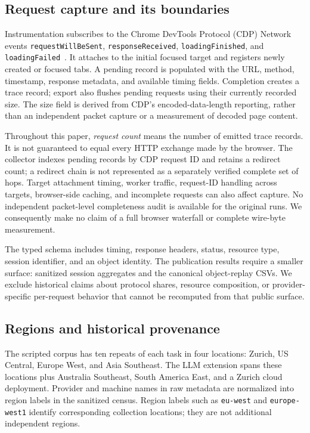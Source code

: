 \documentclass[10pt,sigconf,nonacm]{acmart}
\begin{document}
\subsection{Request capture and its boundaries}
Instrumentation subscribes to the Chrome DevTools Protocol (CDP) Network events \texttt{request\allowbreak Will\allowbreak Be\allowbreak Sent}, \texttt{response\allowbreak Received}, \texttt{loading\allowbreak Finished}, and \texttt{loading\allowbreak Failed}~\cite{cdp}. It attaches to the initial focused target and registers newly created or focused tabs. A pending record is populated with the URL, method, timestamp, response metadata, and available timing fields. Completion creates a trace record; export also flushes pending requests using their currently recorded size. The size field is derived from CDP's encoded-data-length reporting, rather than an independent packet capture or a measurement of decoded page content.

Throughout this paper, \emph{request count} means the number of emitted trace records. It is not guaranteed to equal every HTTP exchange made by the browser. The collector indexes pending records by CDP request ID and retains a redirect count; a redirect chain is not represented as a separately verified complete set of hops. Target attachment timing, worker traffic, request-ID handling across targets, browser-side caching, and incomplete requests can also affect capture. No independent packet-level completeness audit is available for the original runs. We consequently make no claim of a full browser waterfall or complete wire-byte measurement.

The typed schema includes timing, response headers, status, resource type, session identifier, and an object identity. The publication results require a smaller surface: sanitized session aggregates and the canonical object-replay CSVs. We exclude historical claims about protocol shares, resource composition, or provider-specific per-request behavior that cannot be recomputed from that public surface.

\subsection{Regions and historical provenance}
The scripted corpus has ten repeats of each task in four locations: Zurich, US Central, Europe West, and Asia Southeast. The LLM extension spans these locations plus Australia Southeast, South America East, and a Zurich cloud deployment. Provider and machine names in raw metadata are normalized into region labels in the sanitized census. Region labels such as \texttt{eu-west} and \texttt{europe-west1} identify corresponding collection locations; they are not additional independent regions.
\end{document}

